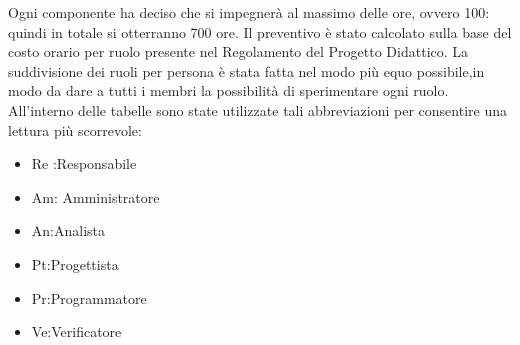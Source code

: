 Ogni componente ha deciso che si impegnerà al massimo delle ore, ovvero 100: quindi in totale si otterranno 700 ore. 
Il preventivo è stato calcolato sulla base del costo orario per ruolo presente nel Regolamento del Progetto Didattico.
La suddivisione dei ruoli per persona è stata fatta nel modo più equo possibile,in modo da dare a tutti i membri la possibilità di 
sperimentare ogni ruolo. \\
All’interno delle tabelle sono state utilizzate tali abbreviazioni per consentire una lettura più scorrevole:
\begin{itemize}
    \item Re :Responsabile
    \item Am: Amministratore
    \item An:Analista
    \item Pt:Progettista
    \item Pr:Programmatore
    \item Ve:Verificatore
\end{itemize}

